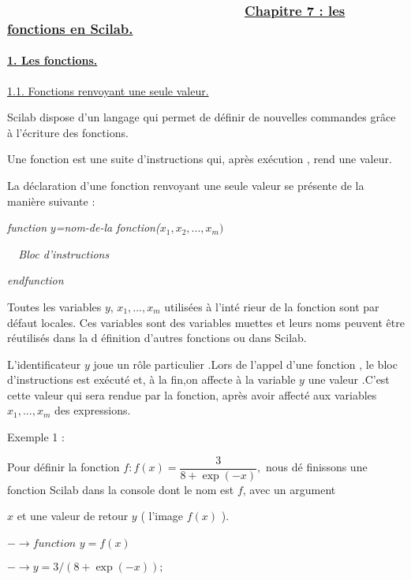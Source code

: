 \documentclass{article}
\begin{document}
\subsubsection{ \ \ \ \ \ \ \ \ \ \ \ \ \ \ \ \ \ \ \ \ \ \ \ \ \ \ \ \ \ \
\ \ \protect\underline{Chapitre 7 : les fonctions en Scilab.}}

\paragraph{\protect\underline{1. Les fonctions.}}

\underline{1.1. Fonctions renvoyant une seule valeur.}

Scilab dispose d'un langage qui permet de d\'{e}finir de nouvelles commandes
gr\^{a}ce \`{a} l'\'{e}criture des fonctions.

Une fonction est une suite d'instructions qui, apr\`{e}s ex\'{e}cution ,
rend une valeur.

La d\'{e}claration d'une fonction renvoyant une seule valeur se pr\'{e}sente
de la mani\`{e}re suivante :

\textit{function }$y$\textit{=nom-de-la fonction(}$x_{1},x_{2},...,x_{m})$

\textit{\ \ Bloc d'instructions}

\textit{endfunction}

Toutes les variables $y$, $x_{1},...,x_{m}$ utilis\'{e}es \`{a} l'int\'{e}%
rieur de la fonction sont par d\'{e}faut locales. Ces variables sont des
variables muettes et leurs noms peuvent \^{e}tre r\'{e}utilis\'{e}s dans la d%
\'{e}finition d'autres fonctions ou dans Scilab.

L'identificateur $y$ joue un r\^{o}le particulier .Lors de l'appel d'une
fonction , le bloc d'instructions est ex\'{e}cut\'{e} et, \`{a} la fin,on
affecte \`{a} la variable $y$ une valeur .C'est cette valeur qui sera rendue
par la fonction, apr\`{e}s avoir affect\'{e} aux variables $x_{1},...,x_{m}$
des expressions.

\bigskip

Exemple 1 :

Pour d\'{e}finir la fonction $f:f(x)=\dfrac{3}{8+\exp (-x)},$ nous d\'{e}%
finissons une fonction Scilab dans la console dont le nom est $f$, avec un
argument

$x$ et une valeur de retour $y$ ( l'image $f(x)$ ).

$-\longrightarrow function$ $y=f(x)$

$-\longrightarrow y=3/(8+\exp (-x));$
\end{document}
